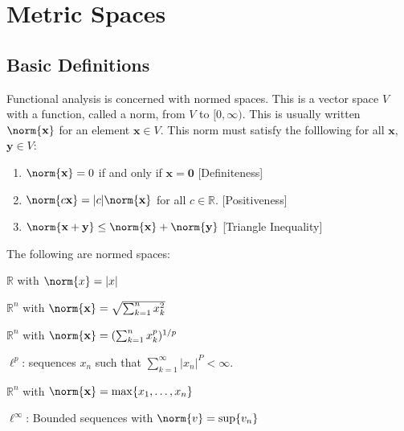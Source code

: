 \documentclass[crop=false,class=book,oneside]{standalone}
\begin{document}
    \section{Metric Spaces}
        \subsection{Basic Definitions}
            Functional analysis is concerned with normed spaces.
            This is a vector space $V$ with a function, called
            a norm, from $V$ to $[0,\infty)$. This is usually
            written $\norm{\mathbf{x}}$ for an element
            $\mathbf{x}\in{V}$. This norm must satisfy the
            folllowing for all $\mathbf{x}$, $\mathbf{y}\in{V}$:
            \begin{enumerate}
                \item $\norm{\mathbf{x}}=0$ if and only
                      if $\mathbf{x}=\mathbf{0}$
                      \hfill[Definiteness]
                \item $\norm{c\mathbf{x}}=|c|\norm{\mathbf{x}}$
                      for all $c\in\mathbb{R}$.
                      \hfill[Positiveness]
                \item $\norm{\mathbf{x}+\mathbf{y}}%
                       \leq\norm{\mathbf{x}}+\norm{\mathbf{y}}$
                      \hfill[Triangle Inequality]
            \end{enumerate}
            \begin{example}
                The following are normed spaces:
                \begin{enumerate}
                    \begin{multicols}{2}
                        \item $\mathbb{R}$ with $\norm{x}=|x|$
                        \item $\mathbb{R}^{n}$ with
                              $\norm{\mathbf{x}}%
                               =\sqrt{\sum_{k=1}^{n}x_{k}^{2}}$
                        \item $\mathbb{R}^{n}$ with
                              $\norm{\mathbf{x}}%
                               =(\sum_{k=1}^{n}x_{k}^{p})^{1/p}$
                        \item $\ell^{p}$: sequences $x_{n}$
                              such that
                              $\sum_{k=1}^{\infty}|x_{n}|^P%
                               <\infty$.
                        \item $\mathbb{R}^{n}$ with
                              $\norm{\mathbf{x}}%
                               =\max\{x_{1},\hdots,x_{n}\}$
                        \item $\ell^{\infty}$: Bounded sequences
                              with $\norm{v}=\sup\{v_{n}\}$
                    \end{multicols}
                \end{enumerate}
            \end{example}
\end{document}
